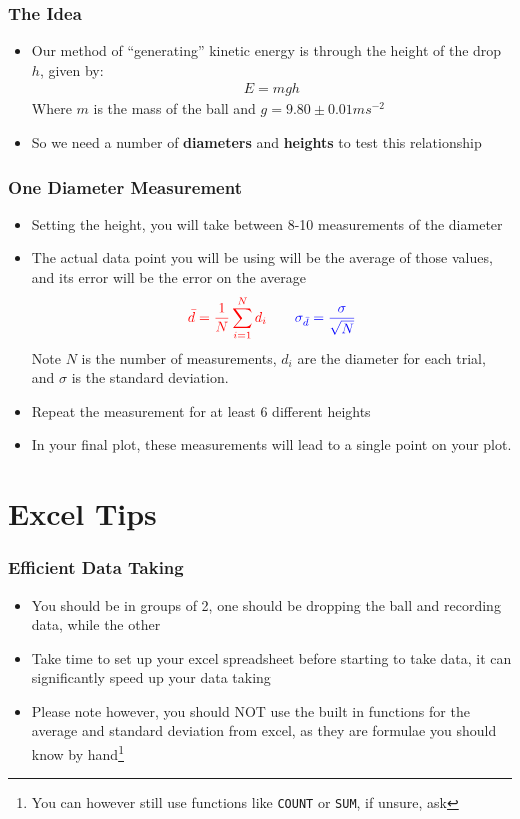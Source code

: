 \documentclass[aspectratio=169]{beamer}
\begin{document}
\begin{frame}
  \frametitle{The Idea}
  \begin{itemize}
  \item Our method of ``generating'' kinetic energy is through the height of the drop $h$, given by:
    \begin{align*}
      E=mgh
    \end{align*}
    Where $m$ is the mass of the ball and $g=9.80\pm0.01\unit{ms^{-2}}$
  \item So we need a number of \textbf{diameters} and \textbf{heights} to test this relationship
  \end{itemize}
\end{frame}

\begin{frame}
  \frametitle{One Diameter Measurement}
  \begin{itemize}
  \item Setting the height, you will take between 8-10 measurements of the diameter
  \item The actual data point you will be using will be the {\color{red}average} of those values, and its error will be the {\color{blue}error on the average}
    \begin{gather*}
      {\color{red}\bar{d}=\frac1N\sum_{i=1}^Nd_i}\qquad
      {\color{blue}\sigma_{\bar{d}}=\frac{\sigma}{\sqrt{N}}}
    \end{gather*}
    Note $N$ is the number of measurements, $d_i$ are the diameter for each trial, and $\sigma$ is the standard deviation.
  \item Repeat the measurement for at least 6 different heights
  \item In your final plot, these measurements will lead to a single point on your plot.
  \end{itemize}
\end{frame}

\section{Excel Tips}
\begin{frame}
  \frametitle{Efficient Data Taking}
  \begin{itemize}
  \item You should be in groups of 2, one should be dropping the ball and recording data, while the other
  \item Take time to set up your excel spreadsheet before starting to take data, it can significantly speed up your data taking
  \item Please note however, you should NOT use the built in functions for the average and standard deviation from excel, as they are formulae you should know by hand\footnote{You can however still use functions like \texttt{COUNT} or \texttt{SUM}, if unsure, ask}
  \end{itemize}
\end{frame}
\end{document}
